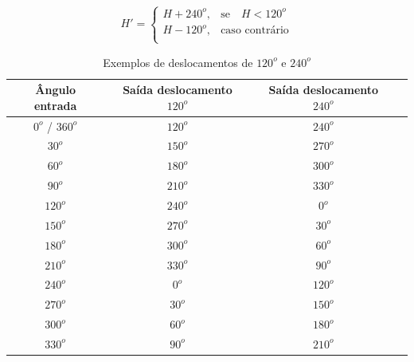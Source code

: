 \documentclass[	12pt, Times, openright, twoside, a4paper, english, brazil]{abntex2}
\begin{document}
\begin{equation}
\label{eq:deslocarH240}
H'=\left\{
\begin{array}{rl}
       H + 240^o,   &\mbox{se}\quad  H < 120^o \\
       H - 120^o,   &\mbox{caso contrário} \\
\end{array}\right.
\end{equation}

\begin{table}[ht]
\centering
\begin{tabular}{cccc}
\hline      

\textbf{Ângulo entrada} & \textbf{Saída deslocamento $120^o$} & \textbf{Saída deslocamento $240^o$}     \\ \hline
$0^o$ / $360^o$         & $120^o$                       &  $240^o$                          \\ \hline
$30^o$                  & $150^o$                       &  $270^o$                          \\ \hline
$60^o$                  & $180^o$                       &  $300^o$                          \\ \hline
$90^o$                  & $210^o$                       &  $330^o$                          \\ \hline
$120^o$                 & $240^o$                       &  $0^o$                            \\ \hline
$150^o$                 & $270^o$                       &  $30^o$                           \\ \hline
$180^o$                 & $300^o$                       &  $60^o$                           \\ \hline
$210^o$                 & $330^o$                       &  $90^o$                           \\ \hline
$240^o$                 & $0^o$                         &  $120^o$                          \\ \hline
$270^o$                 & $30^o$                        &  $150^o$                          \\ \hline
$300^o$                 & $60^o$                        &  $180^o$                          \\ \hline
$330^o$                 & $90^o$                        &  $210^o$                          \\ \hline

\end{tabular}
\caption{Exemplos de deslocamentos de $120^o$ e $240^o$}
\label{tab:exemplosDeslocamento}
\end{table}
\end{document}

